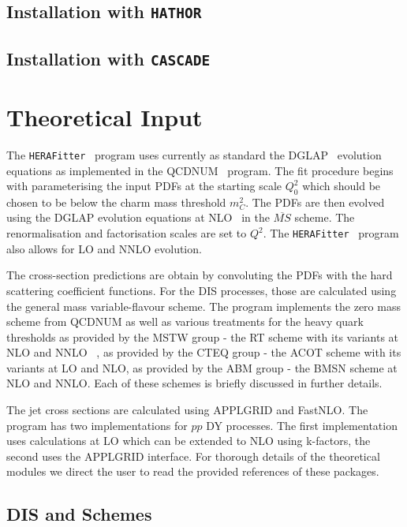 \documentclass[11pt,a4paper]{article}
\newcommand\fitter{ \mbox{\tt HERAFitter} }
\begin{document}
\subsection{Installation with {\tt HATHOR}}
\subsection{Installation with {\tt CASCADE}}

\section{Theoretical Input}
\label{sec:theory}
The \fitter\ program uses currently as standard the DGLAP~\cite{Gribov:1972ri,Gribov:1972rt,Lipatov:1974qm,Dokshitzer:1977sg,Altarelli:1977zs}
 evolution equations as implemented in the QCDNUM~\cite{qcdnum} program. The fit 
procedure begins with parameterising the input PDFs at the starting 
scale $Q^2_0$ which should be chosen to be below the charm mass threshold
$m_C^2$.
The PDFs are then evolved using the DGLAP evolution equations  
at NLO~\cite{Curci:1980uw,Furmanski:1980cm} in the $\overline{MS}$ scheme.
The renormalisation and factorisation scales are set to $Q^2$. The \fitter\ program
also allows for LO and NNLO evolution. 

The cross-section predictions are obtain by convoluting the PDFs with the 
hard scattering coefficient functions. For the DIS processes, those are calculated 
using the general mass variable-flavour scheme. 
The program implements the  zero mass scheme from QCDNUM as well as
various treatments for the heavy quark thresholds as provided by the MSTW group
- the RT scheme with its variants at NLO and NNLO ~\cite{Thorne:1997ga,Thorne:2006qt}, as provided by the CTEQ group - the ACOT scheme with its variants at LO and NLO, as provided by the ABM group - the BMSN scheme at NLO and NNLO.
Each of these schemes is briefly discussed in further details.

The jet cross sections
are calculated using APPLGRID and FastNLO. The program has two implementations
for $pp$  DY processes. The first implementation uses
calculations at LO which can be extended to NLO using k-factors,
the second uses the APPLGRID interface.
For thorough details of the theoretical modules we direct the user to read the provided  references of these packages.


\subsection{DIS and Schemes}
\end{document}
